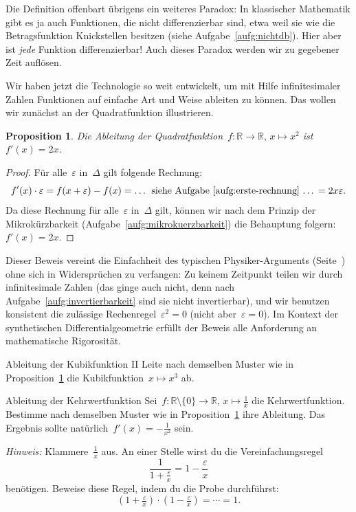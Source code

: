 \documentclass{zirkelblatt}
\newcommand{\RR}{\mathbb{R}}
\theoremstyle{definition}
\theoremstyle{plain}
\newtheorem{prop}[defn]{Proposition}
\theoremstyle{remark}
\begin{document}
Die\marginpar[\hfill\dbend]{\dbend} Definition offenbart übrigens ein weiteres Paradox: In klassischer
Mathematik gibt es ja auch Funktionen, die nicht differenzierbar sind, etwa
weil sie wie die Betragsfunktion Knickstellen besitzen (siehe
Aufgabe~\ref{aufg:nichtdb}). Hier aber ist \emph{jede}
Funktion differenzierbar! Auch dieses Paradox werden wir zu gegebener Zeit
auflösen.

Wir haben jetzt die Technologie so weit entwickelt, um mit Hilfe
infinitesimaler Zahlen Funktionen auf einfache Art und Weise ableiten zu
können. Das wollen wir zunächst an der Quadratfunktion illustrieren.

\begin{prop}\label{prop:ableitung-quadratfunktion-sdg}
Die Ableitung der Quadratfunktion~$f : \RR \to \RR,\,x \mapsto x^2$
ist~$f'(x) = 2x$.\end{prop}
\begin{proof}Für alle~$\varepsilon$ in~$\Delta$ gilt folgende Rechnung:
\[ f'(x) \cdot \varepsilon =
  f(x + \varepsilon) - f(x) =
  \text{\ldots{} siehe Aufgabe~\ref{aufg:erste-rechnung} \ldots} =
  2x\varepsilon. \]
Da diese Rechnung für alle~$\varepsilon$ in~$\Delta$ gilt, können wir nach dem
Prinzip der Mikrokürzbarkeit (Aufgabe~\ref{aufg:mikrokuerzbarkeit}) die
Behauptung folgern: $f'(x) = 2x$.
\end{proof}

Dieser Beweis vereint die Einfachheit des typischen Physiker-Arguments
(Seite~\pageref{par:schizophren}) ohne sich in Widersprüchen zu verfangen: Zu
keinem Zeitpunkt teilen wir durch infinitesimale Zahlen (das ginge auch nicht,
denn nach Aufgabe~\ref{aufg:invertierbarkeit} sind sie nicht invertierbar), und
wir benutzen konsistent die zulässige Rechenregel~$\varepsilon^2 = 0$ (nicht
aber~$\varepsilon = 0$). Im Kontext der synthetischen Differentialgeometrie
erfüllt der Beweis alle Anforderung an mathematische Rigorosität.

\begin{aufgabeShaded}{Ableitung der Kubikfunktion II}
Leite nach demselben Muster wie in
Proposition~\ref{prop:ableitung-quadratfunktion-sdg} die Kubikfunktion~$x
\mapsto x^3$ ab.
\end{aufgabeShaded}

\begin{aufgabeShaded}{Ableitung der Kehrwertfunktion}
Sei~$f : \RR \setminus \{0\} \to \RR,\,x \mapsto \frac{1}{x}$ die
Kehrwertfunktion. Bestimme nach demselben Muster wie in
Proposition~\ref{prop:ableitung-quadratfunktion-sdg} ihre Ableitung.
Das Ergebnis sollte natürlich~$f'(x) = -\frac{1}{x^2}$ sein.

\emph{Hinweis:} Klammere~$\frac{1}{x}$ aus. An einer Stelle wirst du die Vereinfachungsregel
\[ \frac{1}{1 + \frac{\varepsilon}{x}} = 1 - \frac{\varepsilon}{x} \]
benötigen.\footnotemark{}
Beweise diese Regel, indem du die Probe durchführst:
\[ (1 + \tfrac{\varepsilon}{x}) \cdot (1 - \tfrac{\varepsilon}{x}) = \cdots = 1. \]
\end{aufgabeShaded}
\end{document}
